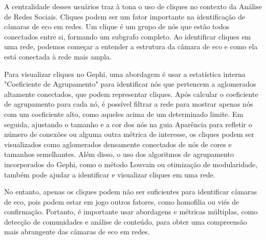 A centralidade desses usuários traz à tona o uso de cliques no contexto da Análise de Redes Sociais. Cliques podem ser um fator importante na identificação de câmaras de eco em redes. Um clique é um grupo de nós que estão todos conectados entre si, formando um subgrafo completo. Ao identificar cliques em uma rede, podemos começar a entender a estrutura da câmara de eco e como ela está conectada à rede mais ampla.

Para visualizar cliques no Gephi, uma abordagem é usar a estatística interna "Coeficiente de Agrupamento" para identificar nós que pertencem a aglomerados altamente conectados, que podem representar cliques. Após calcular o coeficiente de agrupamento para cada nó, é possível filtrar a rede para mostrar apenas nós com um coeficiente alto, como aqueles acima de um determinado limite. Em seguida, ajustando o tamanho e a cor dos nós na guia Aparência para refletir o número de conexões ou alguma outra métrica de interesse, os cliques podem ser visualizados como aglomerados densamente conectados de nós de cores e tamanhos semelhantes. Além disso, o uso dos algoritmos de agrupamento incorporados do Gephi, como o método Louvain ou otimização de modularidade, também pode ajudar a identificar e visualizar cliques em uma rede.

No entanto, apenas os cliques podem não ser suficientes para identificar câmaras de eco, pois podem estar em jogo outros fatores, como homofilia ou viés de confirmação. Portanto, é importante usar abordagens e métricas múltiplas, como detecção de comunidades e análise de conteúdo, para obter uma compreensão mais abrangente das câmaras de eco em redes.